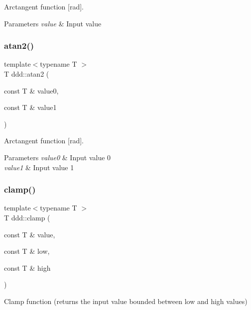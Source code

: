 Arctangent function \mbox{[}rad\mbox{]}. 


\begin{DoxyParams}{Parameters}
{\em value} & Input value \\
\hline
\end{DoxyParams}
\mbox{\label{namespaceddd_a1dea631509d981c3718796774b796d6c}} 
\subsubsection{\texorpdfstring{atan2()}{atan2()}}
{\footnotesize\ttfamily template$<$typename T $>$ \\
T ddd\+::atan2 (\begin{DoxyParamCaption}\item[{const T \&}]{value0,  }\item[{const T \&}]{value1 }\end{DoxyParamCaption})\hspace{0.3cm}{\ttfamily [inline]}}



Arctangent function \mbox{[}rad\mbox{]}. 


\begin{DoxyParams}{Parameters}
{\em value0} & Input value 0 \\
\hline
{\em value1} & Input value 1 \\
\hline
\end{DoxyParams}
\mbox{\label{namespaceddd_a070060e53a22cb16f07576bfb5c4b1cc}} 
\subsubsection{\texorpdfstring{clamp()}{clamp()}}
{\footnotesize\ttfamily template$<$typename T $>$ \\
T ddd\+::clamp (\begin{DoxyParamCaption}\item[{const T \&}]{value,  }\item[{const T \&}]{low,  }\item[{const T \&}]{high }\end{DoxyParamCaption})\hspace{0.3cm}{\ttfamily [inline]}}



Clamp function (returns the input value bounded between low and high values) 



